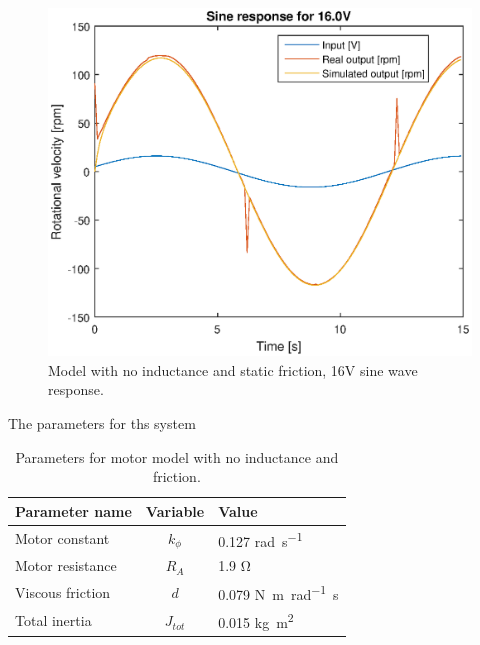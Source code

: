 \begin{figure}[H]
    \centering
    \includegraphics[width=\textwidth]{./img/testrig_16Vsine_no_i_no_fric.eps}
    \caption{Model with no inductance and static friction, 16V sine wave response.}
    \label{fig:sin16_nof}
\end{figure}
The parameters for ths system 
\begin{table}[H]
\caption{Parameters for motor model with no inductance and friction.}
\label{table:model1table}
\begin{center}
\begin{tabular}{lcl}
\textbf{Parameter name} & \textbf{Variable} & \textbf{Value}\\
\toprule
Motor constant & $k_{\phi}$ & 0.127 \si{\radian\per\second} \\
Motor resistance & $R_A$ & 1.9 \si{\ohm} \\
Viscous friction & $d$ & 0.079 \si{\newton\meter\per\radian\second} \\
Total inertia & $J_{tot}$ & 0.015 \si{\kilogram\meter^{2}} \\
\bottomrule
\end{tabular}
\end{center}
\end{table}

